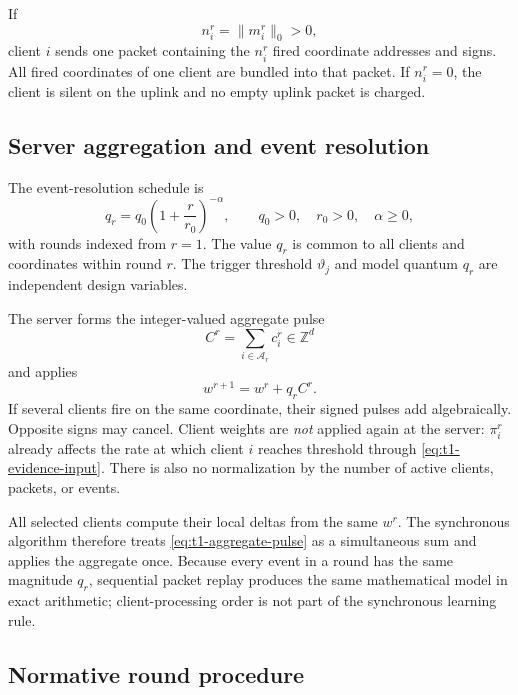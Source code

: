 If
\begin{equation}
    n_i^r=\|m_i^r\|_0>0,
\end{equation}
client $i$ sends one packet containing the $n_i^r$ fired coordinate addresses and signs. All fired coordinates of one client are bundled into that packet. If $n_i^r=0$, the client is silent on the uplink and no empty uplink packet is charged.

\subsection{Server aggregation and event resolution}

The event-resolution schedule is
\begin{equation}
    q_r
    =
    q_0\left(1+\frac{r}{r_0}\right)^{-\alpha},
    \qquad
    q_0>0,\quad r_0>0,\quad \alpha\geq0,
    \label{eq:t1-q-schedule}
\end{equation}
with rounds indexed from $r=1$. The value $q_r$ is common to all clients and coordinates within round $r$. The trigger threshold $\vartheta_j$ and model quantum $q_r$ are independent design variables.

The server forms the integer-valued aggregate pulse
\begin{equation}
    C^r
    =
    \sum_{i\in\mathcal{A}_r}c_i^r
    \in\mathbb{Z}^d
    \label{eq:t1-aggregate-pulse}
\end{equation}
and applies
\begin{equation}
    w^{r+1}
    =
    w^r+q_r C^r.
    \label{eq:t1-server-update}
\end{equation}
If several clients fire on the same coordinate, their signed pulses add algebraically. Opposite signs may cancel. Client weights are \emph{not} applied again at the server: $\pi_i^r$ already affects the rate at which client $i$ reaches threshold through \eqref{eq:t1-evidence-input}. There is also no normalization by the number of active clients, packets, or events.

All selected clients compute their local deltas from the same $w^r$. The synchronous algorithm therefore treats \eqref{eq:t1-aggregate-pulse} as a simultaneous sum and applies the aggregate once. Because every event in a round has the same magnitude $q_r$, sequential packet replay produces the same mathematical model in exact arithmetic; client-processing order is not part of the synchronous learning rule.

\subsection{Normative round procedure}

